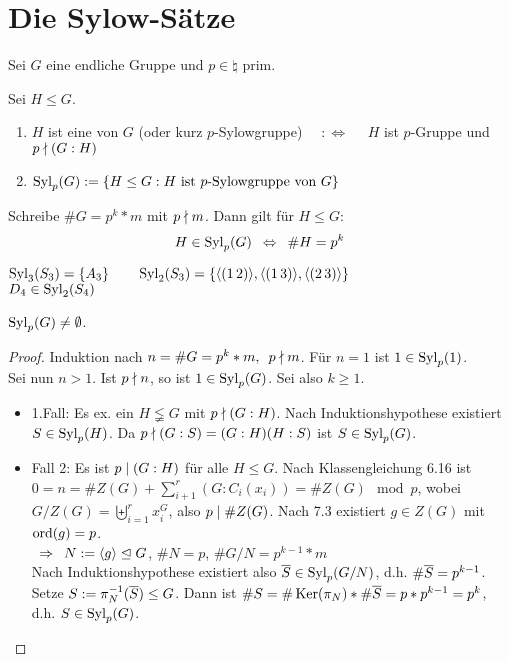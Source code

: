 \section{Die Sylow-Sätze}

Sei $G$ eine endliche Gruppe und $p \in \natural$ prim.
\begin{defin}
	Sei $H \leq G$.
	\begin{enumerate}[label=(\arabic*)]
		\item $H$ ist eine  von $G$ (oder kurz $p$-Sylowgruppe) $\quad :\Leftrightarrow \quad$ $H$ ist $p$-Gruppe und $p \nmid (G:H)$
		\item $\operatorname{Syl}_p(G) := \{ H \leq G: H \text{ ist $p$-Sylowgruppe von } G \}$
	\end{enumerate}
\end{defin}

\begin{bem}
	Schreibe $\# G = p^k*m$ mit $p \nmid m$. Dann gilt für $H \leq G$:
	\begin{align*}
		H \in \operatorname{Syl}_p(G) \enspace \Leftrightarrow \enspace \# H = p^k
	\end{align*}
\end{bem}

\begin{bsp}
	$\operatorname{Syl}_3(S_3) = \{ A_3 \} \qquad \operatorname{Syl}_2(S_3) = \{ \langle (1\,2) \rangle, \langle (1\,3) \rangle, \langle (2\,3) \rangle \}$ \\
	$D_4 \in \operatorname{Syl}_2(S_4)$
\end{bsp}

\begin{satz}
	$\operatorname{Syl}_p(G) \neq \emptyset$.
\end{satz}
\begin{proof}
	Induktion nach $n = \# G = p^k * m, \enspace p \nmid m$.
	Für $n=1$ ist $1 \in \operatorname{Syl}_p(1)$. \\
	Sei nun $n>1$. Ist $p \nmid n$, so ist $1 \in \operatorname{Syl}_p(G)$. Sei also $k \geq 1$.
	\begin{itemize}
		\item 1.Fall: Es ex. ein $H \lneqq G$ mit $p \nmid (G:H)$. Nach Induktionshypothese existiert $S \in \operatorname{Syl}_p(H)$. Da $p \nmid (G:S) = (G:H)(H:S)$ ist $S \in \operatorname{Syl}_p(G)$.
		\item Fall 2: Es ist $p \mid (G:H)$ für alle $H \leq G$. Nach Klassengleichung 6.16 ist $0 = n  = \# Z(G) + \sum_{i+1}^{r}{(G:C_i(x_i))} = \# Z(G) \mod p$, wobei $G/Z(G)=\biguplus_{i=1}^{r}{x_i^G}$, also $p \mid \# Z(G)$. Nach 7.3 existiert $g \in Z(G)$ mit $\operatorname{ord}(g) = p$. \\
		$\enspace \Rightarrow \enspace N := \langle g \rangle \trianglelefteq G$, $\# N = p$, $\# G/N = p^{k-1}*m$ \\
		Nach Induktionshypothese existiert also $\overline{S} \in \operatorname{Syl}_p(G/N)$, d.h. $\# \overline{S} = p^{k-1}$. Setze $S := \pi_N^{-1}(\overline{S}) \leq G$. Dann ist $\# S = \# \operatorname{Ker}(\pi_N) * \# \overline{S} = p*p^{k-1} = p^k$, d.h. $S \in \operatorname{Syl}_p(G)$.
	\end{itemize}
\end{proof}

